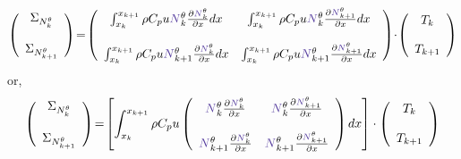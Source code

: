 \[
\left(
\begin{array}{c}
{\Sigma}_{N_k^\theta}  \\ \\ {\Sigma}_{N_{k+1}^\theta}
\end{array}
\right)
\!=\!
\left(
\begin{array}{cc}
\int_{x_k}^{x_{k+1}} \rho C_p u {\color{Violet}N}_k^\theta \frac{\partial      {\color{Violet}N}_{k}^\theta }{\partial x} dx  & 
\int_{x_k}^{x_{k+1}} \rho C_p u {\color{Violet}N}_k^\theta \frac{\partial      {\color{Violet}N}_{k+1}^\theta }{\partial x} dx \\ \\
\int_{x_k}^{x_{k+1}} \rho C_p u {\color{Violet}N}_{k+1}^\theta \frac{\partial  {\color{Violet}N}_{k}^\theta }{\partial x} dx  & 
\int_{x_k}^{x_{k+1}} \rho C_p u {\color{Violet}N}_{k+1}^\theta \frac{\partial  {\color{Violet}N}_{k+1}^\theta }{\partial x} dx 
\end{array}
\right)
\!\cdot\!
\left(
\begin{array}{c}
{T}_k \\ \\
{T}_{k+1}
\end{array}
\right)
\]
or,
\[
\left(
\begin{array}{c}
{\Sigma}_{N_k^\theta} \\ \\ {\Sigma}_{N_{k+1}^\theta}
\end{array}
\right)
\!=\!
\left[
\int_{x_k}^{x_{k+1}}
\rho C_p u
\left(
\begin{array}{cc}
{\color{Violet}N}_k^\theta \frac{\partial     {\color{Violet}N}_{k}^\theta }{\partial x}   & 
{\color{Violet}N}_k^\theta \frac{\partial     {\color{Violet}N}_{k+1}^\theta }{\partial x}  \\ \\
{\color{Violet}N}_{k+1}^\theta \frac{\partial {\color{Violet}N}_{k}^\theta }{\partial x}   & 
{\color{Violet}N}_{k+1}^\theta \frac{\partial {\color{Violet}N}_{k+1}^\theta }{\partial x} 
\end{array}
\right)
dx
\right]
\cdot
\left(
\begin{array}{c}
{T}_k \\ \\ 
{T}_{k+1}
\end{array}
\right)
\]

